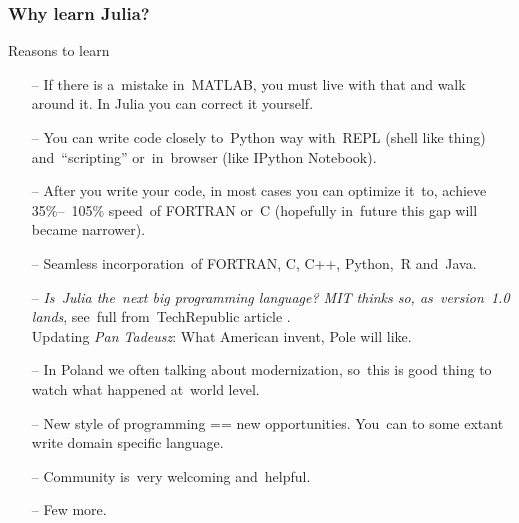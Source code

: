 \documentclass{beamer}  %
\begin{document}
\begin{frame}
  \frametitle{Why learn Julia?}

  \begin{block}{Reasons to learn}
    \begin{itemize}
    \item[--] If there is a~mistake in~MATLAB, you must live with that
      and walk around it. In Julia you can correct it yourself.
    \item[--] You can write code closely to~Python way with~REPL
      (shell like thing) and~``scripting'' or~in~browser (like IPython
      Notebook).
    \item[--] After you write your code, in most cases you can
      optimize it~to, achieve 35\%--~105\% speed~of FORTRAN or~C
      (hopefully in~future this gap will became narrower).
    \item[--] Seamless incorporation~of FORTRAN, C, C++, Python,~R
      and~Java.
    \item[--] \emph{Is~Julia the~next big programming language? MIT
        thinks so, as~version~1.0 lands}, see~full from~TechRepublic
      article
      . \\
      Updating \emph{Pan Tadeusz}: What American invent, Pole will
      like.
    \item[--] In Poland we often talking about modernization, so~this
      is good thing to watch what happened at~world level.
    \item[--] New style of programming == new opportunities. You~can
      to some extant write domain specific language.
    \item[--] Community is~very welcoming and~helpful.
    \item[--] Few more.
    \end{itemize}
  \end{block}

\end{frame}
\end{document}
